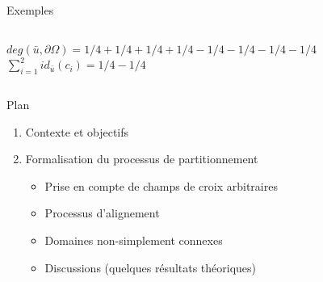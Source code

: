 \documentclass[compress,10pt,aspectratio=169]{beamer}
\begin{document}
\begin{frame}{Exemples}
\begin{columns}
\begin{column}{0.34\textwidth}
{    $deg(\bar{u}, \partial\Omega) = 1/4+1/4+1/4+1/4-1/4-1/4-1/4-1/4$\\\vspace{0.1cm}
    $\sum_{i=1}^{2} id_{\bar{u}}(c_i)=1/4-1/4$\\\vspace{0.2cm}
    \scriptsize\color{onera_gray}{ Nautilus}}
\end{column}
\end{columns}
\end{frame}


\begin{frame}{Plan}
    \vspace{-0.4cm}
    \begin{enumerate}
        \item \color{onera} Contexte et objectifs \\\vspace{0.26cm}
        \item Formalisation du processus de partitionnement %
        \vspace{0.26cm}
        \begin{itemize}
            \item Prise en compte de champs de croix arbitraires\\\vspace{0.18cm}
            \item Processus d'alignement\\\vspace{0.18cm}
            \item Domaines non-simplement connexes\\\vspace{0.18cm}
            \item Discussions (quelques résultats théoriques)\\\vspace{0.18cm}
        \end{itemize}

\end{enumerate}
\end{frame}
\end{document}
